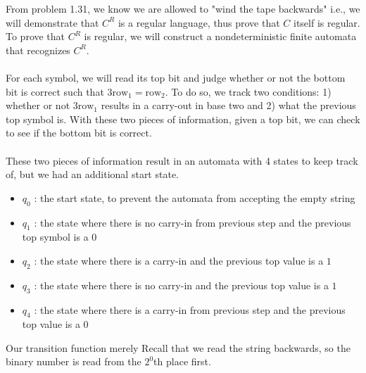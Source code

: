 \documentclass{article}
\begin{document}
From problem 1.31, we know we are allowed to "wind the tape backwards" i.e., we will demonstrate that $C^R$ is a regular language, thus prove that $C$ itself is regular. To prove that $C^R$ is regular, we will construct a nondeterministic finite automata that recognizes $C^R$. \\\\
For each symbol, we will read its top bit and judge whether or not the bottom bit is correct such that $3 \textrm{row}_1 = \textrm{row}_2$. To do so, we track two conditions: 1) whether or not $3 \textrm{row}_1$ results in a carry-out in base two and 2) what the previous top symbol is. With these two pieces of information, given a top bit, we can check to see if the bottom bit is correct.\\\\
These two pieces of information result in an automata with 4 states to keep track of, but we had an additional start state.
\begin{itemize}
    \item $q_0$ : the start state, to prevent the automata from accepting the empty string
    \item $q_1$ : the state where there is no carry-in from previous step and the previous top symbol is a $0$
    \item $q_2$ : the state where there is a carry-in and the previous top value is a $1$
    \item $q_3$ : the state where there is no carry-in and the previous top value is a $1$
    \item $q_4$ : the state where there is a carry-in from previous step and the previous top value is a $0$
\end{itemize}
Our transition function merely
Recall that we read the string backwards, so the binary number is read from the $2^0$th place first. 
\end{document}
